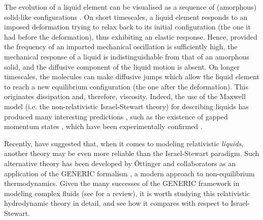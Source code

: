 \documentclass[a4paper, amsfonts, amssymb, amsmath, reprint, showkeys, nofootinbib, twoside, onecolumn, notitlepage]{revtex4-1}
\theoremstyle{definition}
\theoremstyle{theorem}
\begin{document}
The evolution of a liquid element can be visualised as a sequence of (amorphous) solid-like configurations \cite{Nettleton1959,Trachenko2016}. On short timescales, a liquid element responds to an imposed deformation trying to relax back to its initial configuration (the one it had before the deformation), thus exhibiting an elastic response. Hence, provided the frequency of an imparted mechanical oscillation is sufficiently high, the mechanical response of a liquid is indistinguishable from that of an amorphous solid, and the diffusive component of the liquid motion is absent. 
On longer timescales, the molecules can make diffusive jumps which allow the liquid element to reach a new equilibrium configuration (the one after the deformation). This originates dissipation and, therefore, viscosity. 
Indeed, the use of the Maxwell model (i.e. the non-relativistic Israel-Stewart theory) for describing liquids has produced many interesting predictions \citep{Nettleton1959,Truesdell1965}, such as the existence of gapped momentum states \cite{BAGGIOLI20201}, which have been experimentally confirmed \cite{Grimsditch1989,Scarponi2004,Hosokawa_2013,Hosokawa_2015}.

Recently, \citet{Stricker2019} have suggested that, when it comes to modeling relativistic \textit{liquids}, another theory may be even more reliable than the Israel-Stewart paradigm. Such alternative theory has been developed by \"{O}ttinger and collaborators \cite{Otting0_1998,Otting1_1998,Otting2_1999,Otting3_1999} as an application of the GENERIC formalism \cite{Grmela1997}, a modern approach to non-equilibrium thermodynamics. 
Given the many successes of the GENERIC framework in modeling complex fluids (see \cite{OttingerReview2018} for a review), it is worth studying this relativistic hydrodynamic theory in detail, and see how  it compares with respect to Israel-Stewart. 
\end{document}
